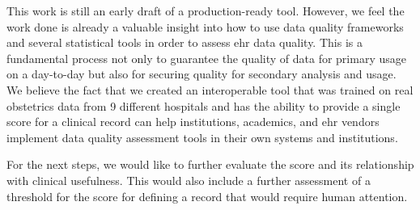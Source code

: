 This work is still an early draft of a production-ready tool. However, we feel the work done is already a valuable insight into how to use data quality frameworks and several statistical tools in order to assess ehr data quality. This is a fundamental process not only to guarantee the quality of data for primary usage on a day-to-day but also for securing quality for secondary analysis and usage.
We believe the fact that we created an interoperable tool that was trained on real obstetrics data from 9 different hospitals and has the ability to provide a single score for a clinical record can help institutions, academics, and ehr vendors implement data quality assessment tools in their own systems and institutions.

For the next steps, we would like to further evaluate the score and its relationship with clinical usefulness. This would also include a further assessment of a  threshold for the score for defining a record that would require human attention.
